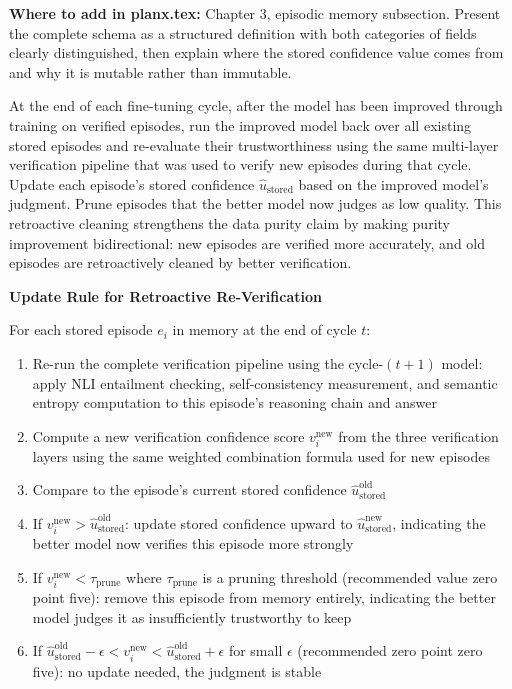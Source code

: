 \documentclass[11pt,a4paper]{article}
\newcommand{\architecturebox}[2]{%
\begin{tcolorbox}[enhanced,breakable,
  colback=LightTeal,colframe=Teal,boxrule=1.5pt,arc=4pt,
  left=8pt,right=8pt,top=6pt,bottom=6pt,
  title={\bfseries\small\color{white}#1},
  attach boxed title to top left={yshift=-2mm,xshift=6mm},
  boxed title style={colback=Teal,arc=3pt,boxrule=0pt,
    left=4pt,right=4pt,top=2pt,bottom=2pt}]
#2
\end{tcolorbox}}
\newcommand{\ustored}{\hat{u}_{\text{stored}}}
\begin{document}
{\textbf{Where to add in planx.tex:} Chapter 3, episodic memory subsection. Present the complete schema as a structured definition with both categories of fields clearly distinguished, then explain where the stored confidence value comes from and why it is mutable rather than immutable.
}

\architecturebox{ARCHITECTURE UPDATE 8: Retroactive Memory Re-Verification Across Cycles}{
At the end of each fine-tuning cycle, after the model has been improved through training on verified episodes, run the improved model back over all existing stored episodes and re-evaluate their trustworthiness using the same multi-layer verification pipeline that was used to verify new episodes during that cycle. Update each episode's stored confidence $\ustored$ based on the improved model's judgment. Prune episodes that the better model now judges as low quality. This retroactive cleaning strengthens the data purity claim by making purity improvement bidirectional: new episodes are verified more accurately, and old episodes are retroactively cleaned by better verification.

\textbf{Update Rule for Retroactive Re-Verification}

For each stored episode $e_i$ in memory at the end of cycle $t$:
\begin{enumerate}
\item Re-run the complete verification pipeline using the cycle-$(t+1)$ model: apply NLI entailment checking, self-consistency measurement, and semantic entropy computation to this episode's reasoning chain and answer
\item Compute a new verification confidence score $v_i^{\text{new}}$ from the three verification layers using the same weighted combination formula used for new episodes
\item Compare to the episode's current stored confidence $\ustored^{\text{old}}$
\item If $v_i^{\text{new}} > \ustored^{\text{old}}$: update stored confidence upward to $\ustored^{\text{new}}$, indicating the better model now verifies this episode more strongly
\item If $v_i^{\text{new}} < \tau_{\text{prune}}$ where $\tau_{\text{prune}}$ is a pruning threshold (recommended value zero point five): remove this episode from memory entirely, indicating the better model judges it as insufficiently trustworthy to keep
\item If $\ustored^{\text{old}} - \epsilon < v_i^{\text{new}} < \ustored^{\text{old}} + \epsilon$ for small $\epsilon$ (recommended zero point zero five): no update needed, the judgment is stable
\end{enumerate}

}
\end{document}
